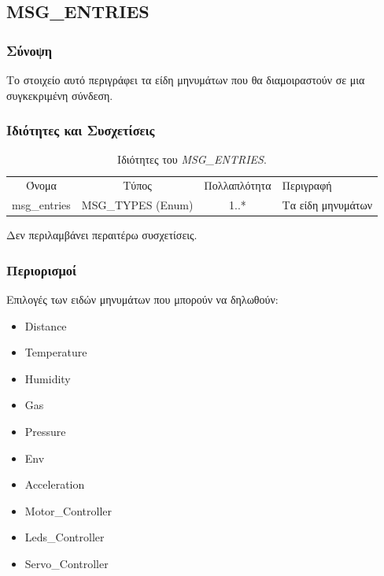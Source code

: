 \subsection{MSG\_ENTRIES}
\label{subsec:msg_entries}

\subsubsection*{Σύνοψη}

\noindent Το στοιχείο αυτό περιγράφει τα είδη μηνυμάτων που θα διαμοιραστούν σε μια συγκεκριμένη σύνδεση.

\subsubsection*{Ιδιότητες και Συσχετίσεις}

\begin{table}[H]
	\begin{center}
		\begin{tabular}{ | c | c | c| m{5.5cm} | }
			\hline
			\rowcolor{Gray}
			\multicolumn{4}{|c|}{\textbf{Ιδιότητες}}\\
			\hline
			\rowcolor{Gray}
			Όνομα & Τύπος & Πολλαπλότητα & Περιγραφή \\
			\hline
			msg\_entries & MSG\_TYPES (Enum) & 1..* & Τα είδη μηνυμάτων \\
			\hline
		\end{tabular}
		\caption{Ιδιότητες του \textit{MSG\_ENTRIES}.}
		\label{tab:msg_entries}
	\end{center}
\end{table}

\noindent Δεν περιλαμβάνει περαιτέρω συσχετίσεις.

\subsubsection*{Περιορισμοί}

\noindent Επιλογές των ειδών μηνυμάτων που μπορούν να δηλωθούν:

\begin{itemize}
	\item Distance
	\item Temperature
	\item Humidity
	\item Gas
	\item Pressure
	\item Env
	\item Acceleration
	\item Motor\_Controller
	\item Leds\_Controller
	\item Servo\_Controller
\end{itemize}

